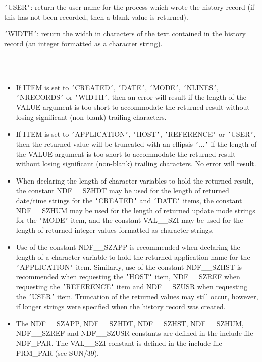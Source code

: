\documentclass[twoside,11pt]{article}
\newcommand{\xref}[3]{#1}
\newcommand{\hi}[1]{{\tt{#1}}}
\newcommand{\sstdiytopic}[2]{\item[{\hspace{-0.35em}#1\hspace{-0.35em}:}]
\mbox{} \\[1.3ex] #2}
\newcommand{\sstitemlist}[1]{
  \mbox{} \\
  \vspace{-3.5ex}
  \begin{itemize}
     #1
  \end{itemize}
}
\newcommand{\sstitem}{\item}
\newcommand{\sstdiytopic}[2]{\item[{#1}] #2 }
\newcommand{\sstitemlist}[1]{
      \begin{itemize}
         #1
      \end{itemize}
      \\
   }
\newcommand{\sstitem}{\item}
\begin{document}
{{{         \sstitem
         \hi{'}USER\hi{'}: return the user name for the process which wrote the
         history record (if this has not been recorded, then a blank value
         is returned).

         \sstitem
         \hi{'}WIDTH\hi{'}: return the width in characters of the text contained
         in the history record (an integer formatted as a character
         string).
      }
   }
   \sstdiytopic{
      Returned String Lengths
   }{
      \sstitemlist{

         \sstitem
         If ITEM is set to \hi{'}CREATED\hi{'}, \hi{'}DATE\hi{'}, \hi{'}MODE\hi{'}, \hi{'}NLINES\hi{'},
         \hi{'}NRECORDS\hi{'} or \hi{'}WIDTH\hi{'}, then an error will result if the length of
         the VALUE argument is too short to accommodate the returned
         result without losing significant (non-blank) trailing
         characters.

         \sstitem
         If ITEM is set to \hi{'}APPLICATION\hi{'}, \hi{'}HOST\hi{'}, \hi{'}REFERENCE\hi{'} or \hi{'}USER\hi{'},
         then the returned value will be truncated with an ellipsis \hi{'}...\hi{'}
         if the length of the VALUE argument is too short to accommodate
         the returned result without losing significant (non-blank)
         trailing characters. No error will result.

         \sstitem
         When declaring the length of character variables to hold the
         returned result, the constant NDF\_\_SZHDT may be used for the
         length of returned date/time strings for the \hi{'}CREATED\hi{'} and \hi{'}DATE\hi{'}
         items, the constant NDF\_\_SZHUM may be used for the length of
         returned update mode strings for the \hi{'}MODE\hi{'} item, and the
         constant VAL\_\_SZI may be used for the length of returned integer
         values formatted as character strings.

         \sstitem
         Use of the constant NDF\_\_SZAPP is recommended when declaring
         the length of a character variable to hold the returned
         application name for the \hi{'}APPLICATION\hi{'} item. Similarly, use of
         the constant NDF\_\_SZHST is recommended when requesting the \hi{'}HOST\hi{'}
         item, NDF\_\_SZREF when requesting the \hi{'}REFERENCE\hi{'} item and
         NDF\_\_SZUSR when requesting the \hi{'}USER\hi{'} item. Truncation of the
         returned values may still occur, however, if longer strings were
         specified when the history record was created.

         \sstitem
         The NDF\_\_SZAPP, NDF\_\_SZHDT, NDF\_\_SZHST, NDF\_\_SZHUM, NDF\_\_SZREF
         and NDF\_\_SZUSR constants are defined in the include file NDF\_PAR.
         The VAL\_\_SZI constant is defined in the include file PRM\_PAR (see
         \xref{SUN/39}{sun39}{}).
      }
   }
}
\end{document}
